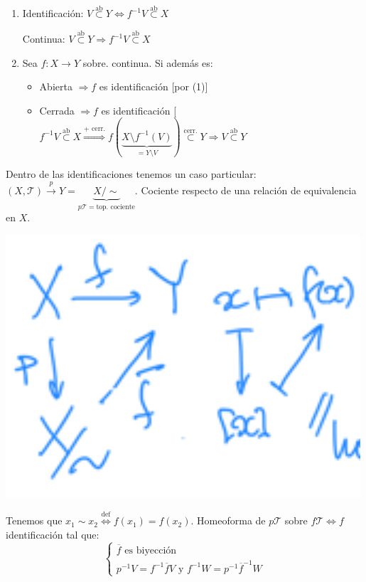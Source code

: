 \begin{obs}
\begin{enumerate}
    \item Identificación: $V \stackrel{\text{ab}}{\subset} Y \Leftrightarrow f^{-1}V \stackrel{\text{ab}}{\subset} X$

    Continua: $V \stackrel{\text{ab}}{\subset } Y \Rightarrow f^{-1}V \stackrel{\text{ab}}{\subset} X$

    \item Sea $f: X \rightarrow Y$ sobre. continua. Si además es:
    \begin{itemize}
        \item Abierta $\Rightarrow f$ es identificación [por (1)]
        \item Cerrada $\Rightarrow f$ es identificación [$f^{-1}V \stackrel{\text{ab}}{\subset} X \stackrel{\text{+ cerr.}}{\Rightarrow} f\left( \underbrace{X \setminus f^{-1}\left( V \right)}_{= Y\setminus V} \right) \stackrel{\text{cerr.}}{\subset} Y \Rightarrow V \stackrel{\text{ab}}{\subset} Y$
    \end{itemize}
\end{enumerate}
\end{obs}

\begin{defi}[Cociente]
Dentro de las identificaciones tenemos un caso particular: $\left( X, \mathcal{T} \right) \stackrel{p}{\rightarrow} Y = \underbrace{X / \sim}_{p \mathcal{T} = \text{top. cociente}}$. Cociente respecto de una relación de equivalencia en $X$. 
\end{defi}
\begin{center}
    \includegraphics[scale=0.2]{images/def_cociente} 
\end{center}
Tenemos que $x_1 \sim x_2 \stackrel{\text{def}}{\Leftrightarrow} f\left( x_1 \right) = f\left( x_2 \right)$. Homeoforma de $p\mathcal{T}$ sobre $f\mathcal{T} \Leftrightarrow f$ identificación tal que:
\[
\begin{cases}
    \overline{f} \text{ es biyección}\\
    p^{-1}V = f^{-1}\overline{f} V \text{ y } f^{-1}W = p^{-1} \overline{f}^{-1}W
\end{cases} 
\]

